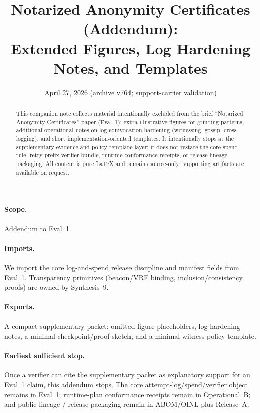 \documentclass[11pt]{article}
\title{Notarized Anonymity Certificates (Addendum):\\Extended Figures, Log Hardening Notes, and Templates}
\author{}
\date{April 27, 2026 (archive v764; support-carrier validation)}
\begin{document}
\maketitle

\begin{abstract}
This companion note collects material intentionally excluded from the brief ``Notarized Anonymity Certificates'' paper (Eval~1):
extra illustrative figures for grinding patterns, additional operational notes on log equivocation hardening (witnessing, gossip, cross-logging),
and short implementation-oriented templates. It intentionally stops at the supplementary evidence and policy-template layer:
it does not restate the core spend rule, retry-prefix verifier bundle, runtime conformance receipts, or release-lineage packaging.
All content is pure \LaTeX{} and remains source-only; supporting artifacts are available on request.\cite{series:artifactpolicy}
\end{abstract}

\paragraph{Scope.}
Addendum to Eval~1.\cite{series:evalnotary}

\paragraph{Imports.}
We import the core log-and-spend release discipline and manifest fields from Eval~1.\cite{series:evalnotary}
Transparency primitives (beacon/VRF binding, inclusion/consistency proofs) are owned by Synthesis~9.\cite{series:transparencyprimitives}

\paragraph{Exports.}
A compact supplementary packet: omitted-figure placeholders, log-hardening notes, a minimal checkpoint/proof sketch, and a minimal witness-policy template.

\paragraph{Earliest sufficient stop.}
Once a verifier can cite the supplementary packet as explanatory support for an Eval~1 claim, this addendum stops.
The core attempt-log/spend/verifier object remains in Eval~1; runtime-plan conformance receipts remain in Operational~B; and public lineage / release packaging remain in ABOM/OINL plus Release~A.\cite{series:evalnotary,series:opB,series:abomoinl,series:releaseA}
\end{document}
